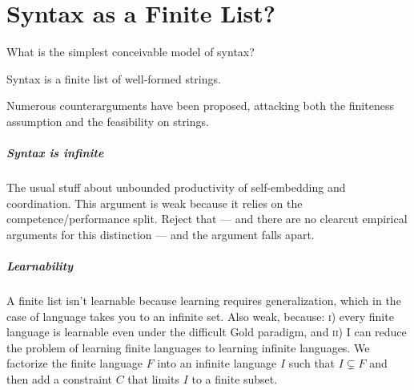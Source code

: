 \chapter{Syntax as a Finite List?}
\label{cha:finitesyntax}

What is the simplest conceivable model of syntax?

\begin{proposal}
    Syntax is a finite list of well-formed strings.
\end{proposal}

Numerous counterarguments have been proposed, attacking both the finiteness assumption and the feasibility on strings.

\paragraph{Syntax is infinite}
%
The usual stuff about unbounded productivity of self-embedding and coordination.
This argument is weak because it relies on the competence\slash performance split.
Reject that --- and there are no clearcut empirical arguments for this distinction --- and the argument falls apart.


\paragraph{Learnability}
%
A finite list isn't learnable because learning requires generalization, which in the case of language takes you to an infinite set.
Also weak, because: \textsc{i}) every finite language is learnable even under the difficult Gold paradigm, and \textsc{ii}) I can reduce the problem of learning finite languages to learning infinite languages.
We factorize the finite language $F$ into an infinite language $I$ such that $I \subsetneq F$ and then add a constraint $C$ that limits $I$ to a finite subset.


